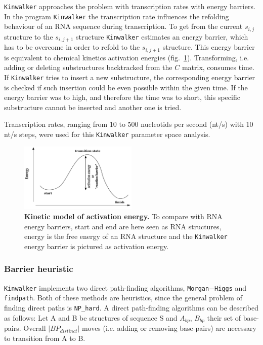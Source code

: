 \documentclass[ twoside,openright,titlepage,numbers=noenddot,headinclude,%
                footinclude=false, cleardoublepage=empty,abstractoff, %
                BCOR=5mm,paper=a4,fontsize=11pt,%
                ngerman,american,%
                ]{scrreprt}
\begin{document}
\texttt{Kinwalker} approaches the problem with transcription rates with energy
barriers.
In the program \texttt{Kinwalker} the transcription rate influences the
refolding behaviour of an RNA sequence during transcription.
To get from the current $s_{i,j}$ structure to the $s_{i,j+1}$ structure
\texttt{Kinwalker} estimates an energy barrier, which has to be overcome in order to
refold to the $s_{i,j+1}$ structure. This energy barrier is equivalent to
chemical kinetics activation energies (fig.~\ref{fig:energyBarrier}).
Transforming, i.e. adding or deleting substructures backtracked from the $C$ matrix, consumes time. If \texttt{Kinwalker} tries to insert a new substructure, the corresponding energy barrier is checked if such insertion could be even possible within the given time. If the energy barrier was to high, and therefore the time was to short, this specific substructure cannot be inserted and another one is tried.
 
Transcription rates, ranging from 10 to 500 nucleotids per second (nt/s) with 10 nt/s steps, were used for this \texttt{Kinwalker} parameter space analysis.
 
\begin{figure}
  \centering
\includegraphics[width=0.5\textwidth]{./pictures/energyBarrier.png}
\caption{{\bf Kinetic model of activation energy.} To compare with RNA energy barriers, start and end are here seen as RNA structures, energy is the free energy of an RNA structure and the \texttt{Kinwalker} energy barrier is pictured as activation energy.}
\label{fig:energyBarrier}
\end{figure}
 
\FloatBarrier
\subsubsection{Barrier heuristic}

\texttt{Kinwalker} implements two direct path-finding algorithms, \texttt{Morgan$-$Higgs} and \texttt{findpath}. Both of these methods are heuristics, since the general problem of finding direct paths is \texttt{NP\_hard}\citep{manuch:2011}.
A direct path-finding algorithms can be described as follows:
Let A and B be structures of sequence S and $A_{bp}$, $B_{bp}$ their set of base-pairs. Overall $|BP_{distinct}|$ moves (i.e. adding or removing base-pairs) are necessary to transition from A to B.
\end{document}
